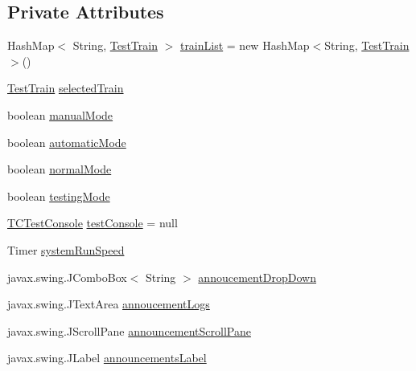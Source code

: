 \subsection*{Private Attributes}
\begin{DoxyCompactItemize}
\item 
Hash\+Map$<$ String, \hyperlink{classTrainControllerComps_1_1TestTrain}{Test\+Train} $>$ \hyperlink{classTrainControllerComps_1_1TrainController_aa9bf2d499464b851e25a5dff388ac94c}{train\+List} = new Hash\+Map$<$String, \hyperlink{classTrainControllerComps_1_1TestTrain}{Test\+Train}$>$()
\item 
\hyperlink{classTrainControllerComps_1_1TestTrain}{Test\+Train} \hyperlink{classTrainControllerComps_1_1TrainController_a8b62cd0090f30fd462d0f84f2bb438a6}{selected\+Train}
\item 
boolean \hyperlink{classTrainControllerComps_1_1TrainController_a68037de65ddc19a31b33d7886474b2d6}{manual\+Mode}
\item 
boolean \hyperlink{classTrainControllerComps_1_1TrainController_ad44c875aa9769f31a25410ea646f939d}{automatic\+Mode}
\item 
boolean \hyperlink{classTrainControllerComps_1_1TrainController_a41985d846631a29f3d90db549d52a922}{normal\+Mode}
\item 
boolean \hyperlink{classTrainControllerComps_1_1TrainController_ab1a7579a2577d5ae7aeb101b2ca9a022}{testing\+Mode}
\item 
\hyperlink{classTrainControllerComps_1_1TCTestConsole}{T\+C\+Test\+Console} \hyperlink{classTrainControllerComps_1_1TrainController_a585f001dc5e1a8e61d777a9a7dbe7734}{test\+Console} = null
\item 
Timer \hyperlink{classTrainControllerComps_1_1TrainController_af6689b889f359a3305af139f76d71409}{system\+Run\+Speed}
\item 
javax.\+swing.\+J\+Combo\+Box$<$ String $>$ \hyperlink{classTrainControllerComps_1_1TrainController_a06551cd4e6a89d9212acf3c76ea2cd42}{annoucement\+Drop\+Down}
\item 
javax.\+swing.\+J\+Text\+Area \hyperlink{classTrainControllerComps_1_1TrainController_ae3d731529db9f86e55f700db1796af58}{annoucement\+Logs}
\item 
javax.\+swing.\+J\+Scroll\+Pane \hyperlink{classTrainControllerComps_1_1TrainController_a389289f396cc6cc64425b57b4dbec510}{announcement\+Scroll\+Pane}
\item 
javax.\+swing.\+J\+Label \hyperlink{classTrainControllerComps_1_1TrainController_a4ebeed63e7e3cf1dc2b835d95cd9746a}{announcements\+Label}

\end{DoxyCompactItemize}
